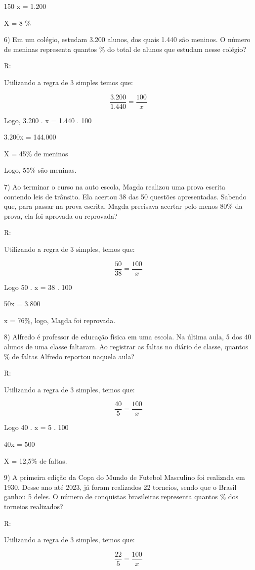 150 x = 1.200

X = 8 \%

6) Em um colégio, estudam 3.200 alunos, dos quais 1.440 são meninos. O
número de meninas representa quantos \% do total de alunos que estudam
nesse colégio?

R:

Utilizando a regra de 3 simples temos que:

\[\frac {3.200}{1.440} = \frac {100}{x}\]

Logo, 3.200 . x = 1.440 . 100

3.200x = 144.000

X = 45\% de meninos

Logo, 55\% são meninas.

7) Ao terminar o curso na auto escola, Magda realizou uma prova escrita
contendo leis de trânsito. Ela acertou 38 das 50 questões apresentadas.
Sabendo que, para passar na prova escrita, Magda precisava acertar pelo
menos 80\% da prova, ela foi aprovada ou reprovada?

R:

Utilizando a regra de 3 simples, temos que:

\[\frac {50}{38} = \frac {100}{x}\]

Logo 50 . x = 38 . 100

50x = 3.800

x = 76\%, logo, Magda foi reprovada.

8) Alfredo é professor de educação física em uma escola. Na última aula,
5 dos 40 alunos de uma classe faltaram. Ao registrar as faltas no diário
de classe, quantos \% de faltas Alfredo reportou naquela aula?

R:

Utilizando a regra de 3 simples, temos que:

\[\frac {40}{5} = \frac {100}{x}\]

Logo 40 . x = 5 . 100

40x = 500

X = 12,5\% de faltas.

9) A primeira edição da Copa do Mundo de Futebol Masculino foi realizada
em 1930. Desse ano até 2023, já foram realizados 22 torneios, sendo que
o Brasil ganhou 5 deles. O número de conquistas brasileiras representa
quantos \% dos torneios realizados?

R:

Utilizando a regra de 3 simples, temos que:

\[\frac {22}{5} = \frac {100}{x}\]

